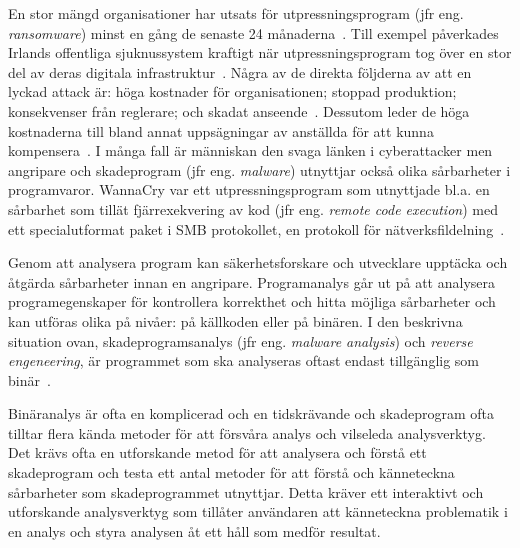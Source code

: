 En stor mängd organisationer har utsats för utpressningsprogram (jfr eng.
\emph{ransomware}) minst en gång de senaste 24 månaderna~\cite{cyberreason2021,
    cyberreason2022}. Till exempel påverkades Irlands offentliga sjuknussystem
kraftigt när utpressningsprogram tog över en stor del av deras digitala
infrastruktur~\cite{hse_report, gallagher2023}.
Några av de direkta följderna av att en lyckad attack är: höga kostnader för
organisationen; stoppad produktion; konsekvenser från reglerare;
och skadat anseende~\cite{cyberreason2021, cyberreason2022}. Dessutom leder
de höga kostnaderna till bland annat uppsägningar av anställda för att kunna
kompensera~\cite{cyberreason2021, cyberreason2022}. I
många fall är människan den svaga länken i cyberattacker men angripare och
skadeprogram (jfr eng. \emph{malware}) utnyttjar också olika sårbarheter i
programvaror. WannaCry var ett utpressningsprogram som utnyttjade bl.a. en
sårbarhet som tillät fjärrexekvering av kod (jfr eng. \emph{remote code
    execution}) med ett specialutformat paket i SMB protokollet, en protokoll
för nätverksfildelning~\cite{enwiki:1152151996}.


Genom att analysera program kan säkerhetsforskare och utvecklare upptäcka
och åtgärda sårbarheter innan en angripare. Programanalys går ut på att
analysera programegenskaper för kontrollera korrekthet och hitta möjliga
sårbarheter och kan utföras olika på nivåer: på källkoden eller på binären. I
den beskrivna situation ovan, skadeprogramsanalys (jfr eng. \emph{malware
    analysis}) och \emph{reverse engeneering}, är programmet som ska analyseras
oftast endast tillgänglig som binär~\cite{andriesse2018}.

Binäranalys är ofta en komplicerad och en tidskrävande och skadeprogram
ofta tilltar flera kända metoder för att försvåra analys och vilseleda
analysverktyg. Det krävs ofta en utforskande metod för att analysera och förstå
ett skadeprogram och testa ett antal metoder för att förstå och känneteckna
sårbarheter som skadeprogrammet utnyttjar. Detta kräver ett interaktivt och
utforskande analysverktyg som tillåter användaren att känneteckna problematik i
en analys och styra analysen åt ett håll som medför resultat.

